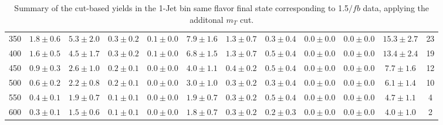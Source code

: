 \begin{table}
{\begin{center}
\begin{tabular}{l c c c c c c c c c c c }
350 & $1.8\pm0.6$ & $5.3\pm2.0$ & $0.3\pm0.2$ & $0.1\pm0.0$ & $7.9\pm1.6$ & $1.3\pm0.7$ & $0.3\pm0.4$ & $0.0\pm0.0$ & $0.0\pm0.0$ & $15.3\pm2.7$ & 23 \\
400 & $1.6\pm0.5$ & $4.5\pm1.7$ & $0.3\pm0.2$ & $0.1\pm0.0$ & $6.8\pm1.5$ & $1.3\pm0.7$ & $0.5\pm0.4$ & $0.0\pm0.0$ & $0.0\pm0.0$ & $13.4\pm2.4$ & 19 \\
450 & $0.9\pm0.3$ & $2.6\pm1.0$ & $0.2\pm0.1$ & $0.0\pm0.0$ & $4.0\pm1.1$ & $0.4\pm0.2$ & $0.5\pm0.4$ & $0.0\pm0.0$ & $0.0\pm0.0$ & $7.7\pm1.6$ & 12 \\
500 & $0.6\pm0.2$ & $2.2\pm0.8$ & $0.2\pm0.1$ & $0.0\pm0.0$ & $3.0\pm1.0$ & $0.3\pm0.2$ & $0.3\pm0.4$ & $0.0\pm0.0$ & $0.0\pm0.0$ & $6.1\pm1.4$ & 10 \\
550 & $0.4\pm0.1$ & $1.9\pm0.7$ & $0.1\pm0.1$ & $0.0\pm0.0$ & $1.9\pm0.7$ & $0.3\pm0.2$ & $0.5\pm0.4$ & $0.0\pm0.0$ & $0.0\pm0.0$ & $4.7\pm1.1$ & 4 \\
600 & $0.3\pm0.1$ & $1.5\pm0.6$ & $0.1\pm0.1$ & $0.0\pm0.0$ & $1.8\pm0.7$ & $0.3\pm0.2$ & $0.2\pm0.3$ & $0.0\pm0.0$ & $0.0\pm0.0$ & $4.0\pm1.0$ & 2 \\
\hline
\end{tabular}
\end{center}
}
\caption{Summary of the cut-based yields in the 1-Jet bin same flavor final state corresponding to 1.5$/fb$ data, applying the additonal $m_T$ cut.}
\end{table}
